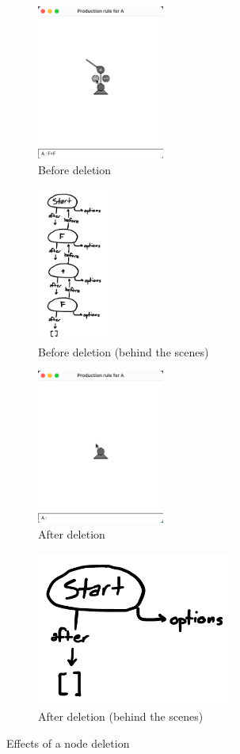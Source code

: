 \documentclass[12pt,twoside]{reedthesis}
\begin{document}
	\begin{figure}[H]
	\centering
	\begin{subfigure}{0.5\textwidth}
		\centering
		\includegraphics[height = 2in, frame]{Images/HowItWorks7A}
		\caption{Before deletion}
		\label {HowItWorks7A}
	\end{subfigure}%
	\begin{subfigure}{0.5\textwidth}
		\centering
		\includegraphics[height=2in, frame]{Images/Diagram3}
		\caption{Before deletion (behind the scenes)}
	\end{subfigure}
	\begin{subfigure}{0.5\textwidth}
		\centering
		\includegraphics[height = 2in, frame]{Images/HowItWorks7C}
		\caption{After deletion}
		\label {HowItWorks7C}
	\end{subfigure}%
	\begin{subfigure}{0.5\textwidth}
		\centering
		\includegraphics[height=2in, frame]{Images/Diagram4}
		\caption{After deletion (behind the scenes)}
	\end{subfigure}
	\caption{Effects of a node deletion}
	\label{NodeDeletion}
	\end{figure}
	
\end{document}
